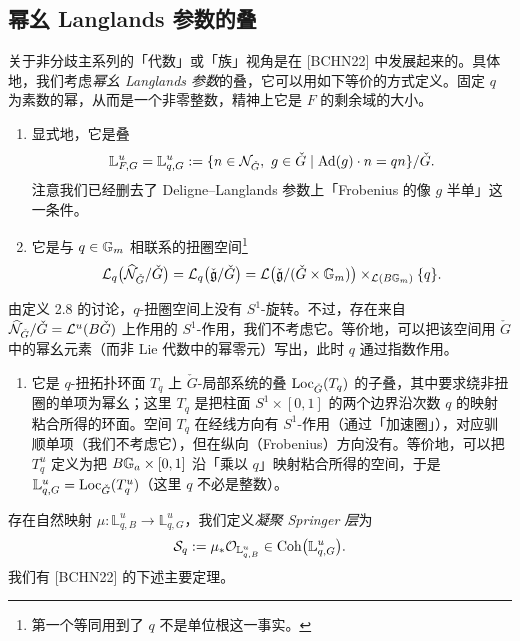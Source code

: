 \subsection{幂幺 Langlands 参数的叠}
关于非分歧主系列的「代数」或「族」视角是在 [BCHN22] 中发展起来的。具体地，我们考虑\emph{幂幺 Langlands 参数}的叠，它可以用如下等价的方式定义。固定 $q$ 为素数的幂，从而是一个非零整数，精神上它是 $F$ 的剩余域的大小。

\begin{enumerate}[label=(\arabic*),leftmargin=2.6em,itemsep=0.2em]
\item 显式地，它是叠
\[
\mathbb L^u_{F,G}=\mathbb L^u_{q,G}:=\{n\in\mathcal{N}_{\check G},\ g\in\check G\mid \mathrm{Ad}(g)\cdot n=qn\}/\check G.
\]
注意我们已经删去了 Deligne–Langlands 参数上「Frobenius 的像 $g$ 半单」这一条件。

\item 它是与 $q\in\mathbb{G}_m$ 相联系的扭圈空间\footnote{第一个等同用到了 $q$ 不是单位根这一事实。}
\[
\mathcal{L}_q\bigl(\widehat{\mathcal{N}}_{\check G}/\check G\bigr)=\mathcal{L}_q\bigl(\check{\mathfrak{g}}/\check G\bigr)
=\mathcal{L}\bigl(\check{\mathfrak{g}}/(\check G\times\mathbb{G}_m)\bigr)\times_{\mathcal{L}(B\mathbb{G}_m)}\{q\}.
\]
\end{enumerate}

由定义 2.8 的讨论，$q$-扭圈空间上没有 $S^1$-旋转。不过，存在来自 $\widehat{\mathcal{N}}_{\check G}/\check G=\mathcal{L}^u(B\check G)$ 上作用的 $S^1$-作用，我们不考虑它。等价地，可以把该空间用 $\check G$ 中的幂幺元素（而非 Lie 代数中的幂零元）写出，此时 $q$ 通过指数作用。

\begin{enumerate}[label=(\arabic*),leftmargin=2.6em,start=3,itemsep=0.2em]
\item 它是 $q$-扭拓扑环面 $T_q$ 上 $\check G$-局部系统的叠 $\operatorname{Loc}_{\check G}(T_q)$ 的子叠，其中要求绕非扭圈的单项为幂幺；这里 $T_q$ 是把柱面 $S^1\times[0,1]$ 的两个边界沿次数 $q$ 的映射粘合所得的环面。空间 $T_q$ 在经线方向有 $S^1$-作用（通过「加速圈」），对应驯顺单项（我们不考虑它），但在纵向（Frobenius）方向没有。等价地，可以把 $T^u_q$ 定义为把 $B\mathbb{G}_a\times[0,1]$ 沿「乘以 $q$」映射粘合所得的空间，于是 $\mathbb L^u_{q,G}=\operatorname{Loc}_{\check G}(T^u_q)$（这里 $q$ 不必是整数）。
\end{enumerate}

存在自然映射 $\mu:\mathbb L^u_{q,B}\to\mathbb L^u_{q,G}$，我们定义\emph{凝聚 Springer 层}为
\[
\mathcal S_q:=\mu_*\mathcal{O}_{\mathbb L^u_{q,B}}\in\operatorname{Coh}\bigl(\mathbb L^u_{q,G}\bigr).
\]
我们有 [BCHN22] 的下述主要定理。

